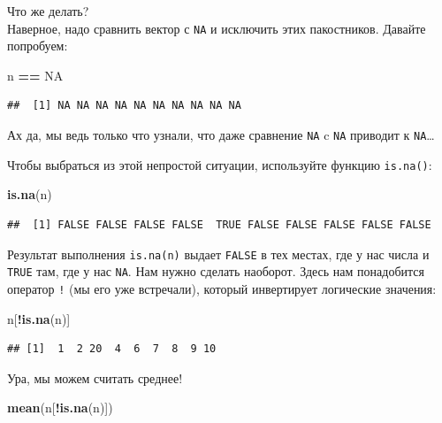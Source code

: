 \documentclass[]{book}
\newenvironment{Shaded}{\begin{snugshade}}{\end{snugshade}}
\newcommand{\KeywordTok}[1]{\textcolor[rgb]{0.13,0.29,0.53}{\textbf{#1}}}
\newcommand{\StringTok}[1]{\textcolor[rgb]{0.31,0.60,0.02}{#1}}
\newcommand{\OtherTok}[1]{\textcolor[rgb]{0.56,0.35,0.01}{#1}}
\newcommand{\OperatorTok}[1]{\textcolor[rgb]{0.81,0.36,0.00}{\textbf{#1}}}
\newcommand{\NormalTok}[1]{#1}
\begin{document}
Что же делать?\\
Наверное, надо сравнить вектор с \texttt{NA} и исключить этих
пакостников. Давайте попробуем:

\begin{Shaded}
\begin{Highlighting}[]
\NormalTok{n }\OperatorTok{==}\StringTok{ }\OtherTok{NA}
\end{Highlighting}
\end{Shaded}

\begin{verbatim}
##  [1] NA NA NA NA NA NA NA NA NA NA
\end{verbatim}

Ах да, мы ведь только что узнали, что даже сравнение \texttt{NA} c
\texttt{NA} приводит к \texttt{NA}\ldots{}

Чтобы выбраться из этой непростой ситуации, используйте функцию
\texttt{is.na()}:

\begin{Shaded}
\begin{Highlighting}[]
\KeywordTok{is.na}\NormalTok{(n)}
\end{Highlighting}
\end{Shaded}

\begin{verbatim}
##  [1] FALSE FALSE FALSE FALSE  TRUE FALSE FALSE FALSE FALSE FALSE
\end{verbatim}

Результат выполнения \texttt{is.na(n)} выдает \texttt{FALSE} в тех
местах, где у нас числа и \texttt{TRUE} там, где у нас \texttt{NA}. Нам
нужно сделать наоборот. Здесь нам понадобится оператор \texttt{!} (мы
его уже встречали), который инвертирует логические значения:

\begin{Shaded}
\begin{Highlighting}[]
\NormalTok{n[}\OperatorTok{!}\KeywordTok{is.na}\NormalTok{(n)]}
\end{Highlighting}
\end{Shaded}

\begin{verbatim}
## [1]  1  2 20  4  6  7  8  9 10
\end{verbatim}

Ура, мы можем считать среднее!

\begin{Shaded}
\begin{Highlighting}[]
\KeywordTok{mean}\NormalTok{(n[}\OperatorTok{!}\KeywordTok{is.na}\NormalTok{(n)])}
\end{Highlighting}
\end{Shaded}
\end{document}
